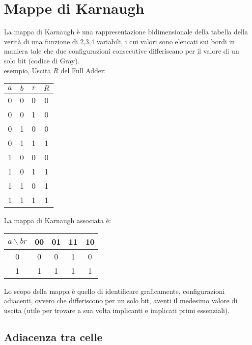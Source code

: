 \documentclass{article}
\begin{document}
\section{Mappe di Karnaugh}

La mappa di Karnaugh è una rappresentazione bidimensionale della tabella della verità di una funzione di 2,3,4 variabili,
i cui valori sono elencati sui bordi in maniera tale che due configurazioni consecutive differiscano per il valore di un solo bit (codice di Gray).\\

\noindent
esempio, Uscita $R$ del Full Adder:

\begin{center}
\begin{tabular}{ |c|c|c|c| }
\hline
$a$ & $b$ & $r$ & $R$ \\
\hline
\hline
0 & 0 & 0 & 0 \\
0 & 0 & 1 & 0 \\
0 & 1 & 0 & 0 \\
0 & 1 & 1 & 1 \\
1 & 0 & 0 & 0 \\
1 & 0 & 1 & 1 \\
1 & 1 & 0 & 1 \\
1 & 1 & 1 & 1 \\
\hline
\end{tabular}
\end{center}

\noindent
La mappa di Karnaugh associata è:

\begin{center}
\begin{tabular}{ |c|c|c|c|c| }
\hline
$a \backslash br$ & 00 & 01 & 11 & 10 \\
\hline
\hline
0 & 0 & 0 & 1 & 0 \\
1 & 1 & 1 & 1 & 1 \\
\hline
\end{tabular}
\end{center}

\noindent
Lo scopo della mappa è quello di identificare graficamente, configurazioni adiacenti,
ovvero che differiscono per un solo bit, aventi il medesimo valore di uscita
(utile per trovare a sua volta implicanti e implicati primi essenziali).

\subsection{Adiacenza tra celle}
\end{document}
